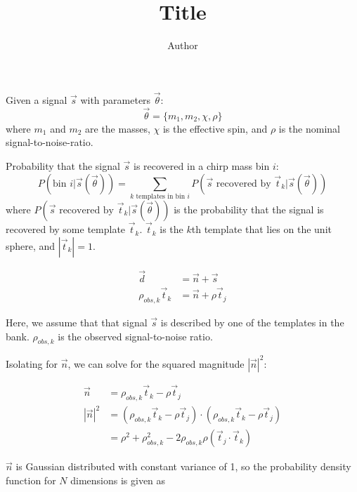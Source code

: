 \documentclass[12pt]{article}
\title{Title}
\author{Author}
\date{}
\newcommand{\ptjtk}{\rho(\vec{t}_j\cdot\vec{t}_k)}
\begin{document}
\maketitle
\tableofcontents

\section{}

Given a signal $\vec{s}$ with parameters $\vec\theta$:
   \begin{equation}
   \vec\theta = \{m_1,m_2,\chi,\rho\}
   \end{equation}
where $m_1$ and $m_2$ are the masses, $\chi$ is the effective spin, and $\rho$ is the nominal signal-to-noise-ratio.

Probability that the signal $\vec{s}$ is recovered in a chirp mass bin $i$:
   \begin{equation}
   P(\text{bin $i$} | \vec{s}(\vec\theta)) = \sum_{\text{$k$ templates in bin $i$}} P(\text{$\vec{s}$ recovered by $\vec{t}_k$}|\vec{s}(\vec\theta))
   \end{equation}
where $P(\text{$\vec{s}$ recovered by $\vec{t}_k$}|\vec{s}(\vec\theta))$ is the probability that the signal is recovered by some template $\vec{t}_k$. $\vec{t}_k$ is the $k$th template that lies on the unit sphere, and $|\vec{t}_k| = 1$.

   \begin{align}
   \vec{d} &= \vec{n} + \vec{s} \\
   \rho_{obs,k}\vec{t}_k &= \vec{n} + \rho\vec{t}_j
   \end{align}

Here, we assume that that signal $\vec{s}$ is described by one of the templates in the bank. $\rho_{obs,k}$ is the observed signal-to-noise ratio.

Isolating for $\vec{n}$, we can solve for the squared magnitude $|\vec{n}|^2$:

   \begin{align}
   \vec{n} &= \rho_{obs,k}\vec{t}_k - \rho\vec{t}_j \\
   |\vec{n}|^2 &= (\rho_{obs,k}\vec{t}_k - \rho\vec{t}_j) \cdot (\rho_{obs,k}\vec{t}_k - \rho\vec{t}_j)\\
               &= \rho^2 + \rho_{obs,k}^2 - 2\rho_{obs,k}\ptjtk
   \label{eqn:n_squaredmagnitude}
   \end{align}
   
$\vec{n}$ is Gaussian distributed with constant variance of 1, so the probability density function for $N$ dimensions is given as
\end{document}
